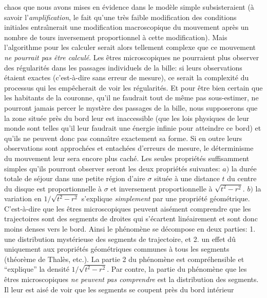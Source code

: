 chaos que nous avons mises en \'evidence dans le mod\`ele simple 
subsisteraient  (\`a savoir l'{\it  amplification}, le fait qu'une tr\`es 
faible modification des conditions initiales entra\^\i nerait une 
modification macroscopique du mouvement apr\`es un nombre de  tours 
inversement proportionnel \`a cette modification). Mais l'algorithme pour 
les calculer serait alors tellement complexe que ce mouvement {\it ne 
pourrait pas \^etre calcul\'e}. Les \^etres microscopiques ne pourraient 
plus observer des r\'egularit\'es dans les passages individuels de la bille: 
si leurs observations \'etaient exactes (c'est-\`a-dire sans erreur de 
mesure), ce serait la complexit\'e du processus qui les emp\^echerait de 
voir les r\'egularit\'es. Et pour \^etre bien certain que les habitants de la 
couronne, qu'il ne faudrait tout de m\^eme pas sous-estimer, ne pourront 
jamais percer le myst\`ere des passages de la bille, nous supposerons que 
la zone situ\'ee pr\`es du bord  leur est inaccessible (que les lois 
physiques de leur monde sont telles qu'il leur faudrait une \' energie 
infinie pour atteindre ce bord) et qu'ils ne peuvent donc pas conna\^\i tre 
exactement sa forme. Si en outre  leurs observations sont approch\'ees et 
entach\'ees d'erreurs de mesure, le d\'eterminisme du mouvement leur 
sera encore plus cach\'e. Les seules propri\'et\'es suffisamment simples 
qu'ils pourront observer seront les deux propri\'et\'es suivantes:   
\smallskip 
$a)$ la dur\'ee totale de s\'ejour dans une petite r\'egion d'aire  
$\sigma$ situ\'ee \`a une distance $t$ du centre du disque est 
proportionnelle \`a $\sigma$ et inversement proportionnelle \`a 
$\sqrt{t^2 - r^2}$.  
\smallskip 
$b)$ la variation en $1 / \sqrt{t^2 - r^2}$ s'explique {\it simplement}  
par une  propri\'et\'e g\'eom\'etrique. C'est-\`a-dire que les \^etres 
microscopiques peuvent ais\'ement comprendre que les trajectoires sont 
des segments de droites qui s'\'ecartent lin\'eairement et sont donc moins 
denses vers le bord.    
\medskip 
Ainsi le ph\'enom\`ene se d\'ecompose en deux parties: 1. une distribution  
myst\'erieuse des segments de trajectoire, et 2. un effet d\^u uniquement  
aux propri\'et\'es g\'eom\'etriques communes \`a tous les segments  
(th\'eor\`eme de Thal\`es, etc.). La partie 2 du ph\'enom\`ene est 
compr\'ehensible et ``explique'' la densit\'e $1 / \sqrt{t^2 - r^2}$. Par 
contre, la partie du ph\'enom\`ene que les \^etres microscopiques  {\it  
ne peuvent pas comprendre} est la distribution des segments. Il leur est 
ais\'e de voir que les segments se coupent pr\`es du bord int\'erieur 
